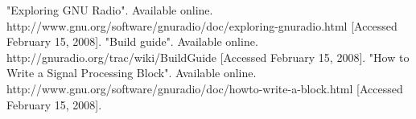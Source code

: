 \documentclass[a4paper,10pt]{article}
\begin{document}
\newpage
\begin{thebibliography}{}
"Exploring GNU Radio". Available online. http:\slash \slash www.gnu.org\slash software\slash gnuradio\slash doc\slash exploring-gnuradio.html [Accessed February 15, 2008].
 "Build guide". Available online. http:\slash \slash gnuradio.org\slash trac\slash wiki\slash BuildGuide [Accessed February 15, 2008].
 "How to Write a Signal Processing Block". Available online. http:\slash \slash www.gnu.org\slash software\slash gnuradio\slash doc\slash howto-write-a-block.html [Accessed February 15, 2008].
\end{thebibliography}
\end{document}
